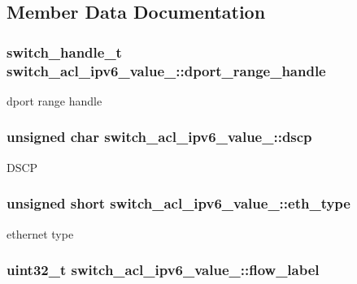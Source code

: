 \subsection{Member Data Documentation}
\hypertarget{unionswitch__acl__ipv6__value___a88a8878c8a0d606f3ad62ed75cdf82cb}{
\subsubsection[{dport\+\_\+range\+\_\+handle}]{\setlength{\rightskip}{0pt plus 5cm}switch\+\_\+handle\+\_\+t switch\+\_\+acl\+\_\+ipv6\+\_\+value\+\_\+\+::dport\+\_\+range\+\_\+handle}}\label{unionswitch__acl__ipv6__value___a88a8878c8a0d606f3ad62ed75cdf82cb}
dport range handle \hypertarget{unionswitch__acl__ipv6__value___af019dc65dfac441baaeaf708fea3de58}{
\subsubsection[{dscp}]{\setlength{\rightskip}{0pt plus 5cm}unsigned char switch\+\_\+acl\+\_\+ipv6\+\_\+value\+\_\+\+::dscp}}\label{unionswitch__acl__ipv6__value___af019dc65dfac441baaeaf708fea3de58}
D\+S\+C\+P \hypertarget{unionswitch__acl__ipv6__value___af908fd9c3046ebd0a9b0fbcce63ae0ac}{
\subsubsection[{eth\+\_\+type}]{\setlength{\rightskip}{0pt plus 5cm}unsigned short switch\+\_\+acl\+\_\+ipv6\+\_\+value\+\_\+\+::eth\+\_\+type}}\label{unionswitch__acl__ipv6__value___af908fd9c3046ebd0a9b0fbcce63ae0ac}
ethernet type \hypertarget{unionswitch__acl__ipv6__value___abd9202b3360c03d783933d0321341523}{
\subsubsection[{flow\+\_\+label}]{\setlength{\rightskip}{0pt plus 5cm}uint32\+\_\+t switch\+\_\+acl\+\_\+ipv6\+\_\+value\+\_\+\+::flow\+\_\+label}}\label{unionswitch__acl__ipv6__value___abd9202b3360c03d783933d0321341523}
